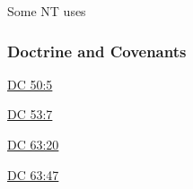 				\begin{compactdesc}
					\item[Some NT uses] \textbf{}
						\begin{compactdesc}
							\item[]
						\end{compactdesc}
				\end{compactdesc}
		
	
		
		
	\subsubsection{Doctrine and Covenants} %
		\label{ENDURE-DC}
	
		
		\begin{compactdesc}
			\item[{\hyperref[DC50-5]{DC 50:5}}] 
			\item[{\hyperref[DC53-7]{DC 53:7}}]
			\item[{\hyperref[DC63-20]{DC 63:20}}]
			\item[{\hyperref[DC63-47]{DC 63:47}}]
		\end{compactdesc}
		
	
		
